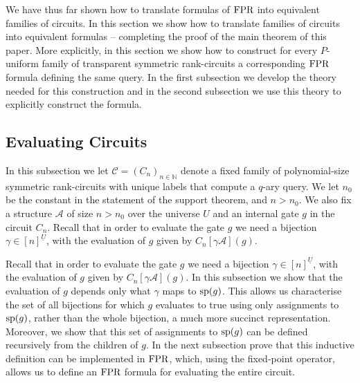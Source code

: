 \documentclass[../paper.tex]{subfiles}
\begin{document}
We have thus far shown how to translate formulas of $\text{\upshape FPR}$ into equivalent
families of circuits. In this section we show how to translate families of
circuits into equivalent formulas -- completing the proof of the main theorem of
this paper. More explicitly, in this section we show how to construct for every
$P$-uniform family of transparent symmetric rank-circuits a corresponding $\text{\upshape FPR}$
formula defining the same query. In the first subsection we develop the theory
needed for this construction and in the second subsection we use this theory to explicitly construct
the formula.


\subsection {Evaluating Circuits}
In this subsection we let $\mathcal{C} = (C_n)_{n \in \mathbb{N}}$ denote a
fixed family of polynomial-size symmetric rank-circuits with unique labels that
compute a $q$-ary query. We let $n_0$ be the constant in the statement of the
support theorem, and $n > n_0$. We also fix a structure $\mathcal{A}$ of size $n
> n_0$ over the universe $U$ and an internal gate $g$ in the circuit $C_n$.
Recall that in order to evaluate the gate $g$ we need a bijection $\gamma \in
[n]^{\underline{U}}$, with the evaluation of $g$ given by $C_n[\gamma
\mathcal{A}](g)$.

Recall that in order to evaluate the gate $g$ we need a bijection $\gamma \in
[n]^{\underline{U}}$, with the evaluation of $g$ given by $C_n[\gamma
\mathcal{A}](g)$. In this subsection we show that the evaluation of $g$ depends
only what $\gamma$ maps to $\text{sp}(g)$. This allows us characterise the set of
all bijections for which $g$ evaluates to true using only assignments to
$\text{sp}(g)$, rather than the whole bijection, a much more succinct
representation. Moreover, we show that this set of assignments to $\text{sp}(g)$
can be defined recursively from the children of $g$. In the next subsection
prove that this inductive definition can be implemented in $\text{\upshape FPR}$, which, using
the fixed-point operator, allows us to define an $\text{\upshape FPR}$ formula for evaluating
the entire circuit.
\end{document}
